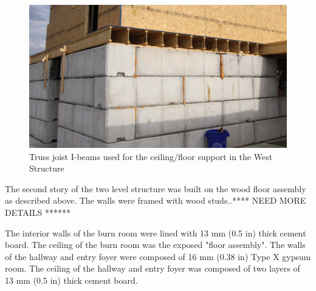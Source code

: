 \documentclass[12pt,oneside]{book}
\begin{document}
\begin{figure}[!ht]
\includegraphics[width=6in]{../Pictures/TJI_support}
\caption[Truss Joist I-Beams]{Truss joist I-beams used for the ceiling/floor support in the West Structure}
\label{fig:TJI}
\end{figure}

The second story of the two level structure was built on the wood floor assembly as described above. The walls were framed with wood studs..**** NEED MORE DETAILS ******

The interior walls of the burn room were lined with 13 mm (0.5 in) thick cement board.  The ceiling of the burn room was the exposed "floor assembly".  The walls of the hallway and entry foyer were composed of 16 mm (0.38 in) Type X gypsum room. The ceiling of the hallway and entry foyer was composed of two layers of 13 mm (0.5 in) thick cement board.  
\end{document}
